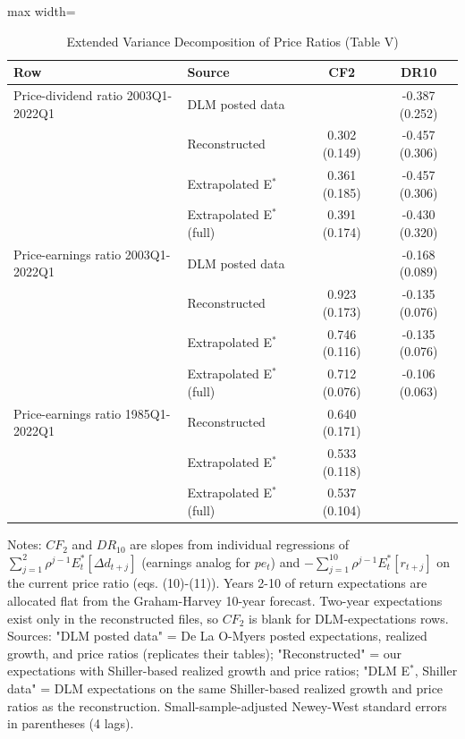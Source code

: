 \documentclass[11pt]{article}
\begin{document}
\begin{table}[H]
\centering
\caption{Extended Variance Decomposition of Price Ratios (Table V)}
\label{tab:t5}
\small
\begin{adjustbox}{max width=\textwidth}
\begin{tabular}{llcc}
\toprule
Row & Source & CF2 & DR10 \\
\midrule
Price-dividend ratio  2003Q1-2022Q1 & DLM posted data &  & -0.387 (0.252) \\
 & Reconstructed & 0.302 (0.149) & -0.457 (0.306) \\
 & Extrapolated E$^*$ & 0.361 (0.185) & -0.457 (0.306) \\
 & Extrapolated E$^*$ (full) & 0.391 (0.174) & -0.430 (0.320) \\
\addlinespace
Price-earnings ratio  2003Q1-2022Q1 & DLM posted data &  & -0.168 (0.089) \\
 & Reconstructed & 0.923 (0.173) & -0.135 (0.076) \\
 & Extrapolated E$^*$ & 0.746 (0.116) & -0.135 (0.076) \\
 & Extrapolated E$^*$ (full) & 0.712 (0.076) & -0.106 (0.063) \\
\addlinespace
Price-earnings ratio  1985Q1-2022Q1 & Reconstructed & 0.640 (0.171) &  \\
 & Extrapolated E$^*$ & 0.533 (0.118) &  \\
 & Extrapolated E$^*$ (full) & 0.537 (0.104) &  \\
\bottomrule
\end{tabular}
\end{adjustbox}

\vspace{2pt}
{\footnotesize Notes: $CF_2$ and $DR_{10}$ are slopes from individual regressions of $\sum_{j=1}^{2}\rho^{j-1}E_t^*[\Delta d_{t+j}]$ (earnings analog for $pe_t$) and $-\sum_{j=1}^{10}\rho^{j-1}E_t^*[r_{t+j}]$ on the current price ratio (eqs. (10)-(11)). Years 2-10 of return expectations are allocated flat from the Graham-Harvey 10-year forecast. Two-year expectations exist only in the reconstructed files, so $CF_2$ is blank for DLM-expectations rows. Sources: "DLM posted data" = De La O-Myers posted expectations, realized growth, and price ratios (replicates their tables); "Reconstructed" = our expectations with Shiller-based realized growth and price ratios; "DLM E$^*$, Shiller data" = DLM expectations on the same Shiller-based realized growth and price ratios as the reconstruction. Small-sample-adjusted Newey-West standard errors in parentheses (4 lags). }
\end{table}
\end{document}

